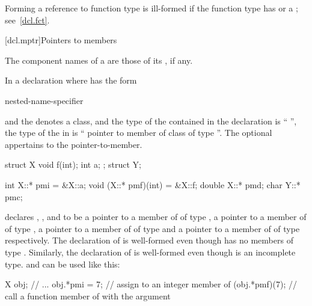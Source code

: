 \pnum
\begin{note}
Forming a reference to function type is ill-formed if the function
type has  or a ;
see~\ref{dcl.fct}.
\end{note}

[dcl.mptr]{Pointers to members}%
%
%

\pnum
{}%
The component names of a  are
those of its , if any.

\pnum
In a declaration
where
has the form
\begin{ncsimplebnf}
nested-name-specifier \terminal{*}   
\end{ncsimplebnf}
and the
denotes a class,
and the type of the contained  in the declaration
is ``
'',
the type of the  in
is ``  pointer to member of class
 of type
''.
The optional  appertains to the
pointer-to-member.

\pnum
\begin{example}
\begin{codeblock}
struct X {
  void f(int);
  int a;
};
struct Y;

int X::* pmi = &X::a;
void (X::* pmf)(int) = &X::f;
double X::* pmd;
char Y::* pmc;
\end{codeblock}
declares
,
,
and
to be a pointer to a member of
of type
,
a pointer to a member of
of type
,
a pointer to a member of
of type
and a pointer to a member of
of type
respectively.
The declaration of
is well-formed even though
has no members of type
.
Similarly, the declaration of
is well-formed even though
is an incomplete type.
and
can be used like this:
\begin{codeblock}
X obj;
// ...
obj.*pmi = 7;       // assign  to an integer member of 
(obj.*pmf)(7);      // call a function member of  with the argument 
\end{codeblock}
\end{example}

